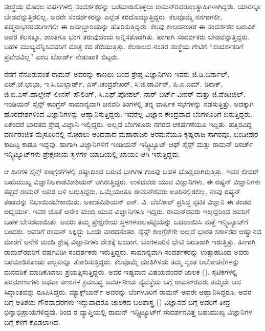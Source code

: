 ಸಂಸ್ಥೆಯ ಮೊದಲ ವರ್ಷಗಳಲ್ಲಿ ಸಂದರ್ಶಕರನ್ನು ಬರಮಾಡಿಕೊಳ್ಳಲು ರಾಮನ್‍ರವರು\break ಉತ್ಸಾಹಿಗಳಾಗಿದ್ದರು. ಯಾರನ್ನೂ ಬೇಡವೆನ್ನುತ್ತಿರಲಿಲ್ಲ. ಅವರೇ ಸಂದರ್ಶಕರನ್ನು ಎಲ್ಲೆಡೆ ಕರದೊಯ್ಯುತ್ತಿದ್ದರು. ಕೆಲವೊಮ್ಮೆ ನನಗಾಗಲೀ, ಪದ್ಮನಾಭನರವರಿಗಾಗಲೀ ಈ ಜವಾಬ್ದಾರಿಯನ್ನು ಹೊರಿಸುತ್ತಿದ್ದರು. ಕೆಲವು ಕಾಲದನಂತರ ಈ ಸಂದರ್ಶಕರ ಬರುವಿಕೆ ಅವರ ಕೆಲಸಕ್ಕೂ, ಶಾಂತಿಗೂ ಭಂಗ ತರುವುದೆಂದು ಅನ್ನಿಸತೊಡಗಿತು. ಹಾಗಾಗಿ ಸಂದರ್ಶಕರು ಬೇಡವೆನ್ನುತ್ತಿದ್ದರು. ಬಹಳ ಮುಖ್ಯವೆನ್ನಿಸಿದವರಿಗೆ ಮಾತ್ರ ಕದ ತೆರೆಯುತ್ತಿತ್ತು. ಕೆಲಕಾಲದ ನಂತರ ಸಂಸ್ಥೆಯ ಗೇಟಿಗೆ “ಸಂದರ್ಶಕರಿಗೆ ಪ್ರವೇಶವಿಲ್ಲ” ಎಂಬ ಬೋರ್ಡ್ ನೇತುಹಾಕಿ ಬಿಟ್ಟರು.

ನನಗೆ ನೆನಪಿರುವಂತೆ ರಾಮನ್ ಅವರನ್ನು ಕಾಣಲು ಬಂದ ಶ್ರೇಷ್ಠ ವಿಜ್ಞಾನಿಗಳು ಇವರು\enginline{-} ಜಿ.ಡಿ.ಬರ್ನಾಲ್, ಎಚ್.ಜೆ.ಭಾಭಾ, ಇ.ಸಿ.ಬುಲ್ಲಾರ್ಡ್, ಎಸ್.ಚಂದ್ರಶೇಖರ್, ಸಿ.ಜಿ.ಡಾರ್ವಿನ್, ಪಿ.ಎ.ಎಮ್. ಡಿರಾಕ್, ಜಿ.ಬಿ.ಎಸ್.ಹಾಲ್ಡೇನ್ ಲೀನಸ್ ಪೌಲಿಂಗ್, ಸಿ.ಎಫ್.ಪೋಪಲ್, ನಾರ್ ಬರ್ಟ್ ವೀನರ್ ಮತ್ತು ಜಿ.ವೆಂಟಜಿಲ್. ಇಂಡಿಯನ್ ಸೈನ್ಸ್ ಕಾಂಗ್ರೆಸ್ ಸಾಮಾನ್ಯವಾಗಿ ಜನವರಿ ತಿಂಗಳಲ್ಲಿ ತನ್ನ ವಾರ್ಷಿಕ ಸಭೆಗಳನ್ನು ನಡೆಸುತ್ತಿತ್ತು. ಅದಕ್ಕಾಗಿ ಹೊರದೇಶಗಳಿಂದ ವಿಜ್ಞಾನಿಗಳನ್ನು ಆಹ್ವಾನಿಸುತ್ತಿದ್ದರು. ಇವರೆಲ್ಲ ವಿಜ್ಞಾನ ಕೇಂದ್ರವಾದ ಬೆಂಗಳೂರಿಗೆ ಬರುತ್ತಿದ್ದರು. ಏಕೆಂದರೆ ಭಾರತದ ಶ್ರೇಷ್ಠ ವಿಜ್ಞಾನಿ ಇಲ್ಲಿದ್ದರು. ಅಲ್ಲದೆ ಬೆಂಗಳೂರು ನಗರದ ಆಕರ್ಷಣೆಯೂ ಇದ್ದಿತು. ಹತ್ತಿರವಿದ್ದ ವರ್ಣರಂಜಿತ ಮೈಸೂರಿನಲ್ಲಿ ನೋಡಲು ಅಂದವಾದ ಮಹಾರಾಜರ ಅರಮನೆಯೂ ಕೃಷ್ಣರಾಜ ಸಾಗರವೂ, ಬಂಡೀಪುರ ಕಾದಿಟ್ಟ ಕಾಡೂ ಇದ್ದವು. ಹಾಗಾಗಿ ವಿಜ್ಞಾನಿಗಳಿಗೆ ಇಂಡಿಯನ್ ಇನ್ಸ್ಟಿಟ್ಯೂಟ್ ಆಫ್ ಸೈನ್ಸ್ ಮತ್ತು ರಾಮನ್ ರಿಸರ್ಚ್ ಇನ್ಸ್ಟಿಟ್ಯೂಟ್‍ಗಳು ಪ್ರೇಕ್ಷಣೀಯ ಸ್ಥಳಗಳ ಯಾದಿಯಲ್ಲಿ ಖಾಯಂ ಆಗಿ ಇರುತ್ತಿದ್ದವು.

\newpage

ಆ ದಿನಗಳ ಸೈನ್ಸ್ ಕಾಂಗ್ರೆಸ್‍ಗಳಲ್ಲಿ ರಷ್ಯಾದಿಂದ ಬರುವ ಭಾಗಿಗಳ ಗುಂಪು ಬಹಳ ದೊಡ್ಡದಾಗಿರು\-ತ್ತಿತ್ತು. ಇವರ ಲೀಡರ್ ಬಹುಮುಖ್ಯ ವಿಜ್ಞಾನಿ\enginline{-}ಅಕಾಡೆಮೀಶಿಯನ್ ಆಗಿರುತ್ತಿದ್ದರು. ಉಳಿದವರು ಯುವ ವಿಜ್ಞಾನಿಗಳು. ಈ ರಷ್ಯನ್ ವಿಜ್ಞಾನಿಗಳು ತಪ್ಪದೆ ರಾಮನ್ ಅವರ ಬಳಿ ಬರುತ್ತಿದ್ದರು. ಒಮ್ಮೆಯಂತೂ ರಾಮನ್‍ರವರು ಊರಿನಲ್ಲಿರಲಿಲ್ಲ. ನಾವು ರಷ್ಯನ್ ತಂಡವನ್ನು ನಿಭಾಯಿಸ\-ಬೇಕಾಯಿತು. ಅಕಾಡೆಮಿಶಿಯನ್ ಎನ್. ವಿ. ಬೆಲೋವ್ ಪ್ರಸಿದ್ಧ ಸ್ಫಟಿಕ ವಿಜ್ಞಾನಿ ಈ ತಂಡದ ಅಧ್ವರ್ಯು. ಇವರ ಜೊತೆ ಅನೇಕ ಮಂದಿ ಯುವ ವಿಜ್ಞಾನಿಗಳೂ ಇದ್ದರು. ರಾಮನ್‍ರವರು ಇಲ್ಲದ್ದರಿಂದ ಅವರಿಗೆ ಬಹಳ ಬೇಸರವಾಯಿತು. ಅವರು ತಮ್ಮ ಪ್ರೇಕ್ಷಣೀಯ ಸ್ಥಳಗಳ\break ಕಾಲಪಟ್ಟಿಯನ್ನು ಬದಲಾಯಿಸಿ ಮತ್ತೆ ಇನ್ಸ್ಟಿಟ್ಯೂಟ್‍ಗೆ ಬಂದರು. ಅವರಿಗೆ ರಾಮನ್ ಸಿಕ್ಕಿದ್ದು ಒಂದು ವಾರದನಂತರ. ಸೈನ್ಸ್ ಕಾಂಗ್ರೆಸ್‍ಗೇ ಅಲ್ಲದೆ ಭಾರತ ಸರ್ಕಾರದ ಆಹ್ವಾನದ ಮೇರೆಗೆ ಅನೇಕ ಮಂದಿ ಶ್ರೇಷ್ಠ ವಿಜ್ಞಾನಿಗಳು ದೇಶಕ್ಕೆ ಬಂದಾಗ, ಬೆಂಗಳೂರಿನ ಭೇಟಿ ಜರೂರಾಗಿ ಇರುತ್ತಿತ್ತು. ಹೀಗಾಗಿ ರಾಮನ್‍ರವರಿಗೆ ವರ್ಷವಿಡೀ ಸಂದರ್ಶಕರು ಇರುತ್ತಿದ್ದರು. ಸಾಮಾನ್ಯವಾಗಿ ಸಂದರ್ಶಕರನ್ನು ಉತ್ಸಾಹದಿಂದ ಅವರು ಬರಮಾಡಿಕೊಂಡು ಎಲ್ಲವನ್ನೂ ತೋರಿಸುತ್ತಿದ್ದರು. ಕೆಲವೊಮ್ಮೆ ಮಾತಿಗಿಳಿದು ತಮ್ಮ ಸ್ವಂತ ಆಲೋಚನೆಗಳನ್ನು ಮನವರಿಕೆ ಮಾಡಿಕೊಡಲು ಪ್ರಯತ್ನಿಸುತ್ತಿದ್ದರು. ಅವರ ಇಷ್ಟವಾದ ವಿಷಯವೆಂದರೆ ಜಾಲಕ (). ಸ್ಪಟಿಕಗಳಲ್ಲಿ ಪರಮಾಣುಗಳು ಅಥವಾ ಅಣುಗಳ ಕ್ರಮಬದ್ಧ ಆವರ್ತನೀಯ ವ್ಯವಸ್ಥೆಯ ಬಗ್ಗೆ ರಾಮನ್‍ರವರು ತಮ್ಮದೇ ಆದ ಸಿದ್ಧಾಂತವನ್ನು ರೂಪಿಸಿದ್ದರು. ಮ್ಯಾಕ್ಸ್‌ಬಾರ್ನ್ ಅವರನ್ನು ಬೆಂಗಳೂರಿಗೆ ರಾಮನ್ ಅವರೇ ಆಹ್ವಾನಿಸಿದ್ದರೂ, ಅವರ ಬಗ್ಗೆ ಅತಿಶಯ ಗೌರವಾದರಗಳು ಇದ್ದುವಾದರೂ ಜಾಲಕದ ಬಲಶಾಸ್ತ್ರ () ವಿಜ್ಞಾನದ ಬಗ್ಗೆ ಅವರಿಗೆ ತೀವ್ರ ಭಿನ್ನಾಭಿಪ್ರಾಯಗಳಿದ್ದವು.  ರಿಂದ ರ ವ್ಯಾಪ್ತಿಯಲ್ಲಿ ರಾಮನ್ ಇನ್ಸ್ಟಿಟ್ಯೂಟ್‍ಗೆ ಸಂದರ್ಶನವಿತ್ತ ಬಹುಮುಖ್ಯ ವಿಜ್ಞಾನಿಗಳ ಬಗ್ಗೆ ಕೆಳಗೆ ಕೊಡಲಾಗಿದೆ.


